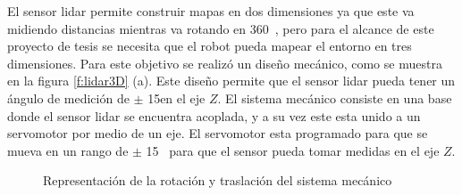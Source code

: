 El sensor lidar permite construir mapas en dos dimensiones ya que este va midiendo 
distancias mientras va rotando en 360\grad ~, pero para el alcance de este proyecto de 
tesis se necesita que el robot pueda mapear el entorno en tres dimensiones. Para este
objetivo se realizó un diseño mecánico, como se muestra en la figura \ref{f:lidar3D} (a). Este
diseño permite que el sensor lidar pueda tener un ángulo de medición de $\pm$ 15\grad en el 
eje $Z$. El sistema mecánico consiste en una base donde el sensor lidar se encuentra acoplada, 
y a su vez este esta unido a un servomotor por medio de un eje. El servomotor esta programado para 
que se mueva en un rango de $\pm$ 15\grad~ para que el sensor pueda tomar medidas 
en el eje $Z$. 

\begin{figure}[ht!]
     \begin{center}
    \end{center}
  \captionsetup{font=footnotesize}
    \caption{\label{f:Rot3D}Representación de la rotación y traslación del sistema mecánico}
\end{figure}


